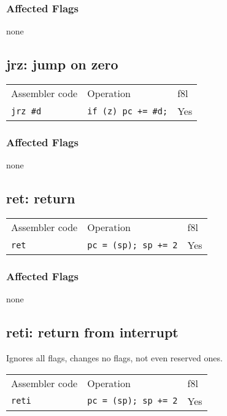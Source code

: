 \documentclass{book}
\begin{document}
\subsubsection*{Affected Flags}

none


\subsection{jrz: jump on zero}

\begin{tabular}{l l l}
Assembler code   & Operation                  & f8l \\
\texttt{jrz \#d} & \texttt{if (z) pc += \#d;} & Yes \\
\end{tabular}

\subsubsection*{Affected Flags}

none


\subsection{ret: return}

\begin{tabular}{l l l}
Assembler code & Operation                   & f8l \\
\texttt{ret}   & \texttt{pc = (sp); sp += 2} & Yes \\
\end{tabular}

\subsubsection*{Affected Flags}

none


\subsection{reti: return from interrupt}

Ignores all flags, changes no flags, not even reserved ones.

\begin{tabular}{l l l}
Assembler code  & Operation                   & f8l \\
\texttt{reti}   & \texttt{pc = (sp); sp += 2} & Yes \\
\end{tabular}
\end{document}
